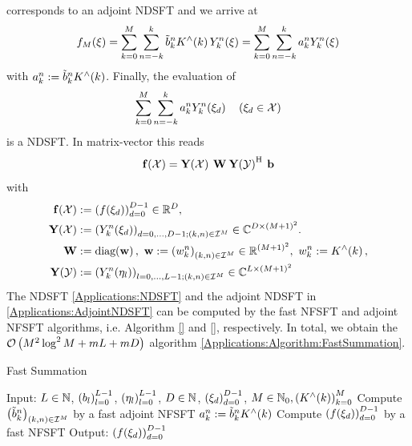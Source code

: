 \documentclass[11pt,a4paper,twoside,bibtotoc]{scrartcl}
\theoremstyle{plain}
\theoremstyle{definition}
\theoremstyle{remark}
\numberwithin{equation}{section}
\numberwithin{table}{section}
\numberwithin{figure}{section}
\begin{document}
corresponds to an adjoint NDSFT and we arrive at
\[
  f_{M}{\hspace{-0.4ex}}\left(\xi\right) = \sum_{k=0}^{M} \sum_{n=-k}^k \tilde{b}_{k}^n K^{\wedge}{\hspace{-0.4ex}}\left(k\right)
                     Y_{k}^n{\hspace{-0.4ex}}\left(\mathbf{\xi}\right) = \sum_{k=0}^{M} \sum_{n=-k}^k a_{k}^n
                     Y_{k}^n{\hspace{-0.4ex}}\left(\mathbf{\xi}\right)
\]
with $a_{k}^n := \tilde{b}_{k}^n K^{\wedge}{\hspace{-0.4ex}}\left(k\right)$. Finally, the evaluation of
\begin{equation}
\label{Applications:NDSFT}
  \sum_{k=0}^{M} \sum_{n=-k}^k a_{k}^n Y_{k}^n{\hspace{-0.4ex}}\left(\mathbf{\xi}_{d}\right) \quad \left(\mathbf{\xi}_{d} \in \mathcal{X}\right)
\end{equation}
is a NDSFT. In matrix-vector this reads
\[
  \mathbf{f}{\hspace{-0.4ex}}\left(\mathcal{X}\right) = \mathbf{Y}{\hspace{-0.4ex}}\left(\mathcal{X}\right) \: \mathbf{W} \: \mathbf{Y}{\hspace{-0.4ex}}\left(\mathcal{Y}\right)^{\text{\rm{H}}} \: \mathbf{b}
\]
with
\begin{align}
  \nonumber
  \fun{\V{f}}{\mathcal{X}} & := \paren{\fun{f}{\V{\xi}_{d}}}_{d=0}^{D-1} \in \R^D,\\
  \nonumber
  \fun{\V{Y}}{\mathcal{X}} & := \paren{\fun{Y_k^n}{\V{\xi}_{d}}}_{d=0,\ldots,D-1; \paren{k,n} \in \mathcal{I}^M} \in \C^{D \times \paren{M+1}^2}. \\
  \nonumber
  \V{W} & := \fun{\diag}{\V{w}},\ \V{w} := \paren{w_{k}^n}_{\paren{k,n} \in \mathcal{I}^M} \in \R^{(M+1)^2},\ w_{k}^n := \fun{K^{\wedge}}{k}, \\
  \nonumber
  \fun{\V{Y}}{\mathcal{Y}} & := \paren{\fun{Y_k^n}{\V{\eta}_{l}}}_{l=0,\ldots,L-1; \paren{k,n} \in \mathcal{I}^M} \in \C^{L \times \paren{M+1}^2}
\end{align}
The NDSFT \eqref{Applications:NDSFT} and the adjoint NDSFT in \eqref{Applications:AdjointNDSFT} can be computed by the fast NFSFT and adjoint NFSFT algorithms, i.e. Algorithm \ref{} and \ref{}, respectively. In total, we obtain the $\mathcal{O}\left(M^2 \log^2 M + mL + mD\right)$ algorithm \ref{Applications:Algorithm:FastSummation}.
\begin{algorithm}[tb]
  \caption{Fast Summation}
  \label{Applications:Algorithm:FastSummation}    
  \begin{algorithmic}
    \STATE  Input:  $L \in \mathbb{N}$, $\left(b_{l}\right)_{l=0}^{L-1}$, $\left(\mathbf{\eta}_{l}\right)_{l=0}^{L-1}$, 
                    $D \in \mathbb{N}$, $\left(\mathbf{\xi}_{d}\right)_{d=0}^{D-1}$, $M \in \mathbb{N}_{0}, \left(K^{\wedge}{\hspace{-0.4ex}}\left(k\right)\right)_{k=0}^M$
    \STATE
    \STATE Compute $\left(\tilde{b}_{k}^n\right)_{\left(k,n\right) \in \mathcal{I}^M}$ by a fast adjoint NFSFT
    \STATE 
        \STATE $a_{k}^n := \tilde{b}_{k}^n K^{\wedge}{\hspace{-0.4ex}}\left(k\right)$
      \ENDFOR
    \ENDFOR
    \STATE
    \STATE Compute $\left(f{\hspace{-0.4ex}}\left(\mathbf{\xi}_{d}\right)\right)_{d=0}^{D-1}$ by a fast NFSFT
    \STATE
    \STATE Output: $\left(f{\hspace{-0.4ex}}\left(\mathbf{\xi}_{d}\right)\right)_{d=0}^{D-1}$
\end{algorithmic}
\end{algorithm}
\end{document}
